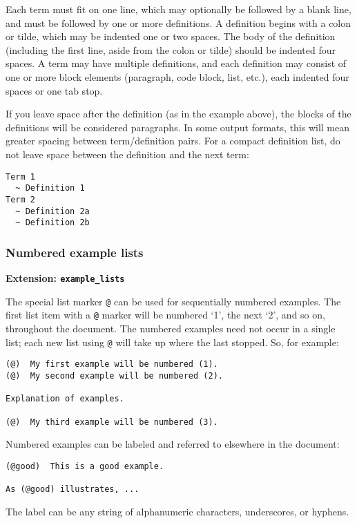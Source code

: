\documentclass[]{article}
\begin{document}
Each term must fit on one line, which may optionally be followed by a
blank line, and must be followed by one or more definitions. A
definition begins with a colon or tilde, which may be indented one or
two spaces. The body of the definition (including the first line, aside
from the colon or tilde) should be indented four spaces. A term may have
multiple definitions, and each definition may consist of one or more
block elements (paragraph, code block, list, etc.), each indented four
spaces or one tab stop.

If you leave space after the definition (as in the example above), the
blocks of the definitions will be considered paragraphs. In some output
formats, this will mean greater spacing between term/definition pairs.
For a compact definition list, do not leave space between the definition
and the next term:

\begin{verbatim}
Term 1
  ~ Definition 1
Term 2
  ~ Definition 2a
  ~ Definition 2b
\end{verbatim}

\subsubsection{Numbered example lists}

\textbf{Extension: \texttt{example\_lists}}

The special list marker \texttt{@} can be used for sequentially numbered
examples. The first list item with a \texttt{@} marker will be numbered
`1', the next `2', and so on, throughout the document. The numbered
examples need not occur in a single list; each new list using \texttt{@}
will take up where the last stopped. So, for example:

\begin{verbatim}
(@)  My first example will be numbered (1).
(@)  My second example will be numbered (2).

Explanation of examples.

(@)  My third example will be numbered (3).
\end{verbatim}

Numbered examples can be labeled and referred to elsewhere in the
document:

\begin{verbatim}
(@good)  This is a good example.

As (@good) illustrates, ...
\end{verbatim}

The label can be any string of alphanumeric characters, underscores, or
hyphens.
\end{document}
